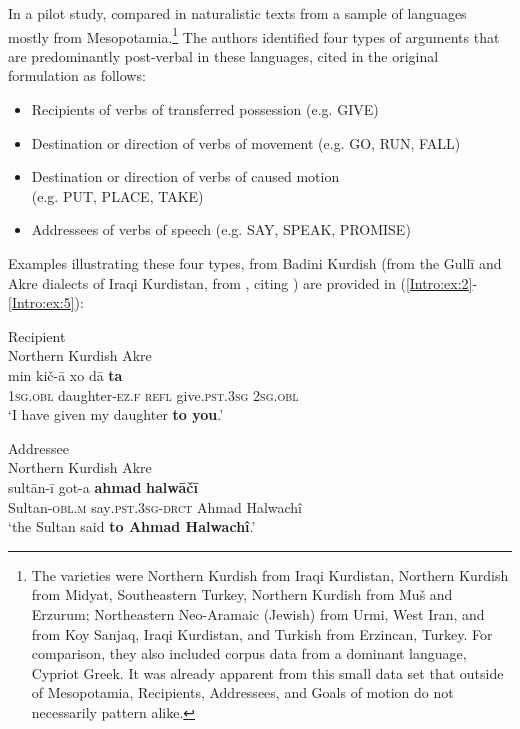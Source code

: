 \documentclass[output=paper,colorlinks,citecolor=brown,collectionchapter]{langscibook}
\begin{document}
In a pilot study, \citet{haig_post-predicate_2014} compared  in naturalistic texts from a sample of languages mostly from Mesopotamia.\footnote{The varieties were Northern Kurdish from Iraqi Kurdistan, Northern Kurdish from Midyat, Southeastern Turkey, Northern Kurdish from Muš and Erzurum; Northeastern Neo-Aramaic (Jewish) from Urmi, West Iran, and from Koy Sanjaq, Iraqi Kurdistan, and Turkish from Erzincan, Turkey. For comparison, they also included corpus data from a dominant  language, Cypriot Greek. It was already apparent from this small data set that outside of Mesopotamia, Recipients, Addressees, and Goals of motion do not necessarily pattern alike.} The authors identified four types of arguments that are predominantly post-verbal in these languages, cited in the original formulation as follows:

\begin{itemize}
    \item Recipients of verbs of transferred possession (e.g. GIVE)
    \item Destination or direction of verbs of movement (e.g. GO, RUN, FALL)
    \item Destination or direction of verbs of caused motion \\ (e.g. PUT, PLACE, TAKE)
    \item Addressees of verbs of speech (e.g. SAY, SPEAK, PROMISE)
\end{itemize}


Examples illustrating these four types, from Badini Kurdish (from the Gullī and Akre dialects of Iraqi Kurdistan, from \citealt{haig_post-predicate_2014}, citing \citealt{mackenzie_kurdish_1962}) are provided in (\ref{Intro:ex:2}-\ref{Intro:ex:5}):

\ea\label{Intro:ex:2} 
Recipient\\
Northern Kurdish Akre \citep{mackenzie_kurdish_1962} \\
\gll min kič-ā xo dā \textbf{ta} \\
\textsc{1sg.obl} daughter\textsc{-ez.f} \textsc{refl} give\textsc{.pst.3sg} \textsc{2sg.obl} \\
\glt `I have given my daughter \textbf{to you}.'
\z

\ea\label{Intro:ex:3} 
Addressee\\
Northern Kurdish Akre \citep{mackenzie_kurdish_1962} \\
\gll sultān-ī got-a \textbf{ahmad} \textbf{halwāčī} \\
Sultan\textsc{-obl.m} say\textsc{.pst.3sg-drct} Ahmad Halwachî \\
\glt `the Sultan said \textbf{to Ahmad Halwachî}.'
\z
\end{document}
